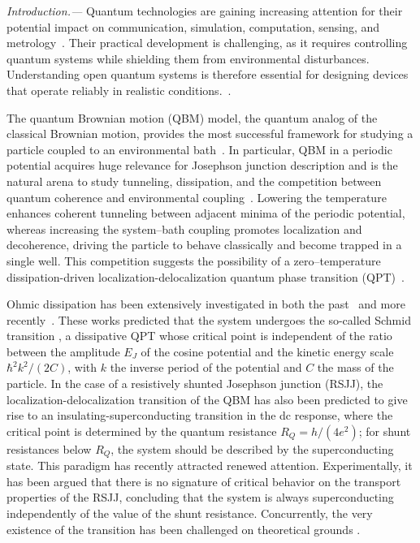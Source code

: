 \documentclass[aps,notitlepage,twocolumn,prl,nolongbibliography,superscriptaddress]{revtex4-2}
\begin{document}
\maketitle

\textit{Introduction.---}
Quantum technologies are gaining increasing attention for their potential impact on communication, simulation, computation, sensing, and metrology~\cite{Dowling_rev, Acin_rev}. Their practical development is challenging, as it requires controlling quantum systems while shielding them from environmental disturbances. Understanding open quantum systems is therefore essential for designing devices that operate reliably in realistic conditions.~\cite{Zurek_rev,breuer_petruccione_book}.

The quantum Brownian motion (QBM) model, the quantum analog of the classical Brownian motion, provides the most successful framework for studying a particle coupled to an environmental bath~\cite{breuer_petruccione_book, Caldeira_Leggett_1, Grabert}. In particular, QBM in a periodic potential acquires huge relevance for Josephson junction description and is the natural arena to study tunneling, dissipation, and the competition between quantum coherence and environmental coupling~\cite{Caldeira_Leggett_2, Chakravarty}.
Lowering the temperature enhances coherent tunneling between adjacent minima of the periodic potential, whereas increasing the system--bath coupling promotes localization and decoherence, driving the particle to behave classically and become trapped in a single well. This competition suggests the possibility of a zero--temperature dissipation-driven localization-delocalization quantum phase transition (QPT)~\cite{Sachdev_book}.

Ohmic dissipation has been extensively investigated in both the past~\cite{Schmid, Bulgadaev, Fisher_Zwerger, Weiss_5th_edition} and more recently~\cite{Troyer_MC, Troyer_PRL, Comment_absence_Hakonen_Sonin, Glazman_1, Glazman_2, Glazman_3, Glazman_4, Glazman_5, Glazman_6}. These works predicted that the system undergoes the so-called Schmid transition \cite{Schmid, Bulgadaev}, a dissipative QPT whose critical point is independent of the ratio between the amplitude $E_J$ of the cosine potential and the kinetic energy scale $\hbar^2 k^2/(2C)$, with $k$ the inverse period of the potential and $C$ the mass of the particle. In the case of a resistively shunted Josephson junction (RSJJ), the localization-delocalization transition of the QBM has also been predicted to give rise to an insulating-superconducting transition in the dc response, where the critical point is determined by the quantum resistance $R_Q = h/(4e^2)$; for shunt resistances below $R_Q$, the system should be described by the superconducting state. This paradigm has recently attracted renewed attention. Experimentally, it has been argued \cite{Murani_absence, Murani_reply} that there is no signature of critical behavior on the transport properties of the RSJJ, concluding that the system is always superconducting independently of the value of the shunt resistance. Concurrently, the very existence of the transition has been challenged on theoretical grounds \cite{Murani_absence, Murani_reply, Altimiras:2023trq, notaa, Masuki_Absence, Masuki_reply, Comment_absence_Sepulcre}.
\end{document}
